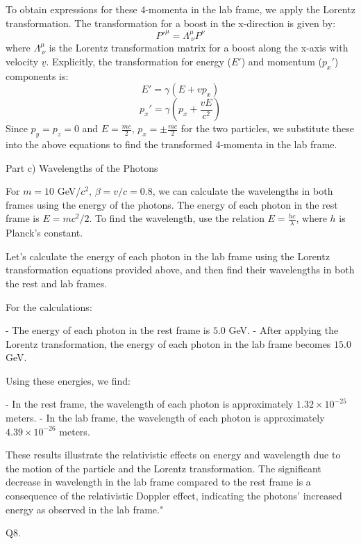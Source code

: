 To obtain expressions for these 4-momenta in the lab frame, we apply the Lorentz transformation. The transformation for a boost in the x-direction is given by:
\[ P'^\mu = \Lambda^\mu_{\ \nu} P^\nu \]
where \( \Lambda^\mu_{\ \nu} \) is the Lorentz transformation matrix for a boost along the x-axis with velocity \( \underline{v} \). Explicitly, the transformation for energy (\( E' \)) and momentum (\( p_x' \)) components is:
\[ E' = \gamma(E + v p_x) \]
\[ p_x' = \gamma(p_x + \frac{vE}{c^2}) \]
Since \( p_y = p_z = 0 \) and \( E = \frac{mc}{2} \), \( p_x = \pm \frac{mc}{2} \) for the two particles, we substitute these into the above equations to find the transformed 4-momenta in the lab frame.

Part c) Wavelengths of the Photons

For \( m = 10 \) GeV/\( c^2 \), \( \beta = v/c = 0.8 \), we can calculate the wavelengths in both frames using the energy of the photons. The energy of each photon in the rest frame is \( E = mc^2/2 \). To find the wavelength, use the relation \( E = \frac{hc}{\lambda} \), where \( h \) is Planck's constant.

Let's calculate the energy of each photon in the lab frame using the Lorentz transformation equations provided above, and then find their wavelengths in both the rest and lab frames.

For the calculations:

- The energy of each photon in the rest frame is \(5.0\) GeV.
- After applying the Lorentz transformation, the energy of each photon in the lab frame becomes \(15.0\) GeV.

Using these energies, we find:

- In the rest frame, the wavelength of each photon is approximately \(1.32 \times 10^{-25}\) meters.
- In the lab frame, the wavelength of each photon is approximately \(4.39 \times 10^{-26}\) meters.

These results illustrate the relativistic effects on energy and wavelength due to the motion of the particle and the Lorentz transformation. The significant decrease in wavelength in the lab frame compared to the rest frame is a consequence of the relativistic Doppler effect, indicating the photons' increased energy as observed in the lab frame."



                           Q8. 

